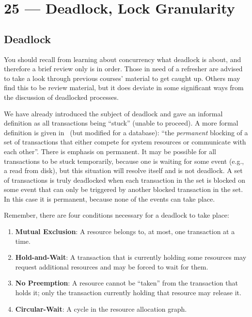 \documentclass[a4paper]{report}
\begin{document}
\chapter*{25 --- Deadlock, Lock Granularity}


\section*{Deadlock}

You should recall from learning about concurrency what deadlock is about, and therefore a brief review only is in order. Those in need of a refresher are advised to take a look through previous courses' material to get caught up. Others may find this to be review material, but it does deviate in some significant ways from the discussion of deadlocked processes.

We have already introduced the subject of deadlock and gave an informal definition as all transactions being ``stuck'' (unable to proceed). A more formal definition is given in~\cite{osi} (but modified for a database): ``the \textit{permanent} blocking of a set of transactions that either compete for system resources or communicate with each other''. There is emphasis on permanent. It may be possible for all transactions to be stuck temporarily, because one is waiting for some event (e.g., a read from disk), but this situation will resolve itself and is not deadlock. A set of transactions is truly deadlocked when each transaction in the set is blocked on some event that can only be triggered by another blocked transaction in the set. In this case it is permanent, because none of the events can take place.

Remember, there are four conditions necessary for a deadlock to take place:

\begin{enumerate}
	\item \textbf{Mutual Exclusion}: A resource belongs to, at most, one transaction at a time.
	\item \textbf{Hold-and-Wait}: A transaction that is currently holding some resources may request additional resources and may be forced to wait for them.
	\item \textbf{No Preemption}: A resource cannot be ``taken'' from the transaction that holds it; only the transaction currently holding that resource may release it.
	\item \textbf{Circular-Wait}: A cycle in the resource allocation graph.
\end{enumerate}
\end{document}
